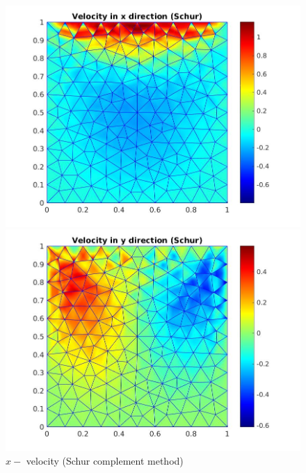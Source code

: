 \documentclass[a4paper]{book}
\begin{document}
\begin{figure}
  \begin{minipage}[c]{0.67\textwidth}
    \includegraphics[width=\textwidth]{lid_schur_vx.jpg}
  \end{minipage}\hfill
  \begin{minipage}[c]{0.3\textwidth}
    \caption{$x-$ velocity (Schur complement method)} \label{x_vel_stoke_schur_lid}
  \end{minipage}
  \begin{minipage}[c]{0.67\textwidth}
    \includegraphics[width=\textwidth]{lid_schur_vy.jpg}
  \end{minipage}\hfill
  \begin{minipage}[c]{0.3\textwidth}

\end{minipage}
\end{figure}
\end{document}
